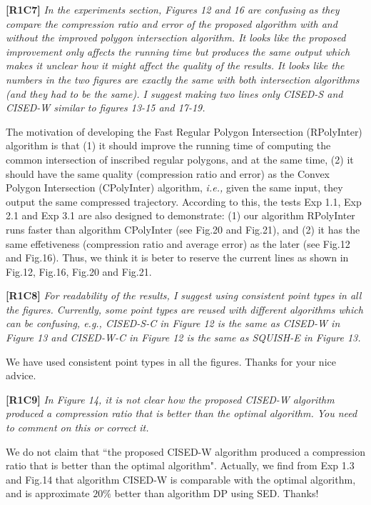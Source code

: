 \documentclass{letter}
\newcommand{\ie}{\emph{i.e.,}\xspace}
\begin{document}
\textbf{[R1C7]} \emph{In the experiments section, Figures 12 and 16 are confusing as they compare the compression ratio and error of the proposed algorithm with and without the improved polygon intersection algorithm. It looks like the proposed improvement only affects the running time but produces the same output which makes it unclear how it might affect the quality of the results. It looks like the numbers in the two figures are exactly the same with both intersection algorithms (and they had to be the same). I suggest making two lines only CISED-S and CISED-W similar to figures 13-15 and 17-19.}

The motivation of developing the Fast Regular Polygon Intersection (RPolyInter) algorithm is that (1) it should improve the running time of computing the common intersection of inscribed regular polygons, and at the same time, (2) it should have the same quality (compression ratio and error) as the Convex Polygon Intersection (CPolyInter) algorithm, \ie  given the same input, they output the same compressed trajectory.
According to this, the tests Exp 1.1, Exp 2.1 and Exp 3.1 are also designed to demonstrate: (1) our algorithm RPolyInter runs faster than algorithm CPolyInter (see Fig.20 and Fig.21), and (2) it has the same effetiveness (compression ratio and average error) as the later (see Fig.12 and Fig.16). 
%
Thus, we think it is beter to reserve the current lines as shown in Fig.12, Fig.16, Fig.20 and Fig.21. %

\textbf{[R1C8]} \emph{For readability of the results, I suggest using consistent point types in all the figures. Currently, some point types are reused with different algorithms which can be confusing, e.g., CISED-S-C in Figure 12 is the same as CISED-W in Figure 13 and CISED-W-C in Figure 12 is the same as SQUISH-E in Figure 13.}

We have used consistent point types in all the figures. Thanks for your nice advice.

\textbf{[R1C9]} \emph{In Figure 14, it is not clear how the proposed CISED-W algorithm produced a compression ratio that is better than the optimal algorithm. You need to comment on this or correct it.}

We do not claim that ``the proposed CISED-W algorithm produced a compression ratio that is better than the optimal algorithm".
Actually, we find from Exp 1.3 and Fig.14 that algorithm CISED-W is comparable with the optimal algorithm, and is approximate $20\%$ better than algorithm DP using SED. 
Thanks!
\end{document}
